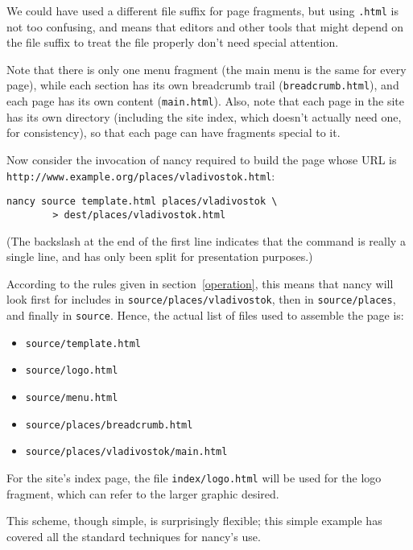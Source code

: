 \documentclass[english]{scrartcl}
\begin{document}
We could have used a different file suffix for page fragments, but
using \verb|.html| is not too confusing, and means that editors and
other tools that might depend on the file suffix to treat the file
properly don't need special attention.

Note that there is only one menu fragment (the main menu is the same
for every page), while each section has its own breadcrumb trail
(\verb|breadcrumb.html|), and each page has its own content
(\verb|main.html|). Also, note that each page in the site has its
own directory (including the site index, which doesn't actually need
one, for consistency), so that each page can have fragments special to
it.

Now consider the invocation of nancy required to build the page whose
URL is \verb|http://www.example.org/places/vladivostok.html|:

\begin{verbatim}
nancy source template.html places/vladivostok \
        > dest/places/vladivostok.html
\end{verbatim}

(The backslash at the end of the first line indicates that the command
is really a single line, and has only been split for presentation
purposes.)

According to the rules given in section~\ref{operation}, this means
that nancy will look first for includes in
\verb|source/places/vladivostok|, then in \verb|source/places|,
and finally in \verb|source|. Hence, the actual list of files used
to assemble the page is:

\begin{itemize}
\item \verb|source/template.html|
\item \verb|source/logo.html|
\item \verb|source/menu.html|
\item \verb|source/places/breadcrumb.html|
\item \verb|source/places/vladivostok/main.html|
\end{itemize}

For the site's index page, the file \verb|index/logo.html| will be
used for the logo fragment, which can refer to the larger graphic
desired.

This scheme, though simple, is surprisingly flexible; this simple
example has covered all the standard techniques for nancy's use.
\end{document}
